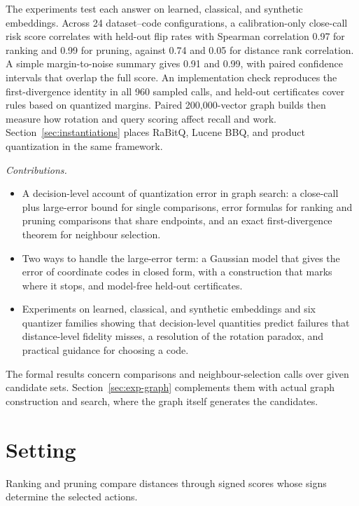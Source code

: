 \documentclass[twoside,11pt]{article}
\begin{document}
The experiments test each answer on learned, classical, and synthetic embeddings. Across 24 dataset--code configurations, a calibration-only close-call risk score correlates with held-out flip rates with Spearman correlation 0.97 for ranking and 0.99 for pruning, against 0.74 and 0.05 for distance rank correlation. A simple margin-to-noise summary gives 0.91 and 0.99, with paired confidence intervals that overlap the full score. An implementation check reproduces the first-divergence identity in all 960 sampled calls, and held-out certificates cover rules based on quantized margins. Paired 200{,}000-vector graph builds then measure how rotation and query scoring affect recall and work. Section~\ref{sec:instantiations} places RaBitQ, Lucene BBQ, and product quantization in the same framework.

\noindent\emph{Contributions.}\quad
\begin{itemize}
\setlength{\itemsep}{2pt}
\setlength{\parsep}{0pt}
\item A decision-level account of quantization error in graph search: a close-call plus large-error bound for single comparisons, error formulas for ranking and pruning comparisons that share endpoints, and an exact first-divergence theorem for neighbour selection.
\item Two ways to handle the large-error term: a Gaussian model that gives the error of coordinate codes in closed form, with a construction that marks where it stops, and model-free held-out certificates.
\item Experiments on learned, classical, and synthetic embeddings and six quantizer families showing that decision-level quantities predict failures that distance-level fidelity misses, a resolution of the rotation paradox, and practical guidance for choosing a code.
\end{itemize}

The formal results concern comparisons and neighbour-selection calls over given candidate sets. Section~\ref{sec:exp-graph} complements them with actual graph construction and search, where the graph itself generates the candidates.

\section{Setting}
\label{sec:setting}

Ranking and pruning compare distances through signed scores whose signs determine the selected actions.
\end{document}
